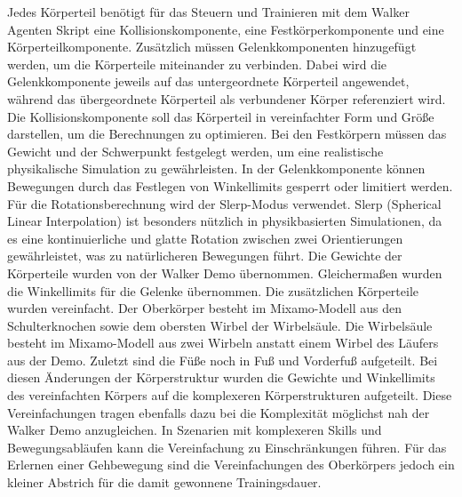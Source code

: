 Jedes Körperteil benötigt für das Steuern und Trainieren mit dem Walker Agenten Skript eine Kollisionskomponente, eine Festkörperkomponente und eine Körperteilkomponente. Zusätzlich müssen Gelenkkomponenten hinzugefügt werden, um die Körperteile miteinander zu verbinden. Dabei wird die Gelenkkomponente jeweils auf das untergeordnete Körperteil angewendet, während das übergeordnete Körperteil als verbundener Körper referenziert wird. Die Kollisionskomponente soll das Körperteil in vereinfachter Form und Größe darstellen, um die Berechnungen zu optimieren. Bei den Festkörpern müssen das Gewicht und der Schwerpunkt festgelegt werden, um eine realistische physikalische Simulation zu gewährleisten. In der Gelenkkomponente können Bewegungen durch das Festlegen von Winkellimits gesperrt oder limitiert werden. Für die Rotationsberechnung wird der Slerp-Modus verwendet. Slerp (Spherical Linear Interpolation) ist besonders nützlich in physikbasierten Simulationen, da es eine kontinuierliche und glatte Rotation zwischen zwei Orientierungen gewährleistet, was zu natürlicheren Bewegungen führt. Die Gewichte der Körperteile wurden von der Walker Demo übernommen. Gleichermaßen wurden die Winkellimits für die Gelenke übernommen. Die zusätzlichen Körperteile wurden vereinfacht. Der Oberkörper besteht im Mixamo-Modell aus den Schulterknochen sowie dem obersten Wirbel der Wirbelsäule. Die Wirbelsäule besteht im Mixamo-Modell aus zwei Wirbeln anstatt einem Wirbel des Läufers aus der Demo. Zuletzt sind die Füße noch in Fuß und Vorderfuß aufgeteilt. Bei diesen Änderungen der Körperstruktur wurden die Gewichte und Winkellimits des vereinfachten Körpers auf die komplexeren Körperstrukturen aufgeteilt. Diese Vereinfachungen tragen ebenfalls dazu bei die Komplexität möglichst nah der Walker Demo anzugleichen. In Szenarien mit komplexeren Skills und Bewegungsabläufen kann die Vereinfachung zu Einschränkungen führen. Für das Erlernen einer Gehbewegung sind die Vereinfachungen des Oberkörpers jedoch ein kleiner Abstrich für die damit gewonnene Trainingsdauer.


